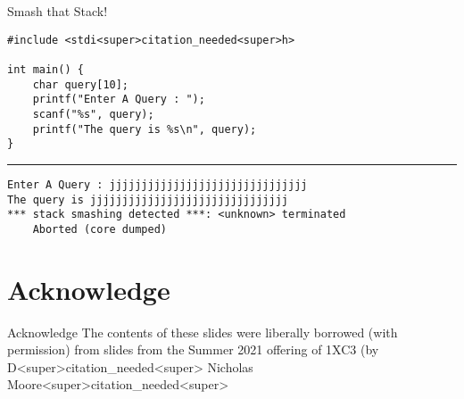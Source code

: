 \documentclass[11pt]{beamer}
\begin{document}
\begin{frame}[fragile=singleslide]{Smash that Stack!}
\begin{lstlisting}[style = C]
#include <stdi<super>citation_needed<super>h>

int main() {
	char query[10];
	printf("Enter A Query : ");
	scanf("%s", query);
	printf("The query is %s\n", query);
}
\end{lstlisting}
\hrule
\begin{lstlisting}[style=terminal]
Enter A Query : jjjjjjjjjjjjjjjjjjjjjjjjjjjjjjj
The query is jjjjjjjjjjjjjjjjjjjjjjjjjjjjjjj
*** stack smashing detected ***: <unknown> terminated
	Aborted (core dumped)
\end{lstlisting}
\end{frame}

\section[Acknowledge]{Acknowledge}
\begin{frame}{Acknowledge}
\center
\vspace{8em}
The contents of these slides were liberally borrowed (with permission) from slides from the Summer 2021 offering of 1XC3 (by D<super>citation_needed<super> Nicholas Moore<super>citation_needed<super>  
\end{frame}
\end{document}
